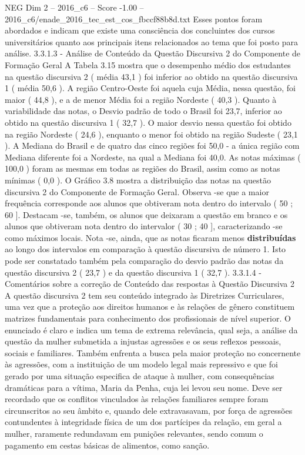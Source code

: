 \begin{textsample}{NEG Dim 2 – 2016\_c6 – Score -1.00 – 2016\_c6/enade\_2016\_tec\_est\_cos\_fbccf88b8d.txt}
Esses pontos foram abordados e indicam que existe uma consciência dos concluintes dos cursos universitários quanto aos principais itens relacionados ao tema que foi posto para análise. 3.3.1.3 - Análise de Conteúdo da Questão Discursiva 2 do Componente de Formação Geral A Tabela 3.15 mostra que o desempenho médio dos estudantes na questão discursiva 2 ( média 43,1 ) foi inferior ao obtido na questão discursiva 1 ( média 50,6 ).
A região Centro-Oeste foi aquela cuja Média, nessa questão, foi maior ( 44,8 ), e a de menor Média foi a região Nordeste ( 40,3 ).
Quanto à variabilidade das notas, o Desvio padrão de todo o Brasil foi 23,7, inferior ao obtido na questão discursiva 1 ( 32,7 ).
O maior desvio nessa questão foi obtido na região Nordeste ( 24,6 ), enquanto o menor foi obtido na região Sudeste ( 23,1 ).
A Mediana do Brasil e de quatro das cinco regiões foi 50,0 - a única região com Mediana diferente foi a Nordeste, na qual a Mediana foi 40,0.
As notas máximas ( 100,0 ) foram as mesmas em todas as regiões do Brasil, assim como as notas mínimas ( 0,0 ).
O Gráfico 3.8 mostra a distribuição das notas na questão discursiva 2 do Componente de Formação Geral.
Observa -se que a maior frequência corresponde aos alunos que obtiveram nota dentro do intervalo ( 50 ; 60 ].
Destacam -se, também, os alunos que deixaram a questão em branco e os alunos que obtiveram nota dentro do intervalor ( 30 ; 40 ], caracterizando -se como máximos locais.
Nota -se, ainda, que as notas ficaram menos \textbf{distribuídas} ao longo dos intervalos em comparação à questão discursiva de número 1.
Isto pode ser constatado também pela comparação do desvio padrão das notas da questão discursiva 2 ( 23,7 ) e da questão discursiva 1 ( 32,7 ). 3.3.1.4 - Comentários sobre a correção de Conteúdo das respostas à Questão Discursiva 2 A questão discursiva 2 tem seu conteúdo integrado às Diretrizes Curriculares, uma vez que a proteção aos direitos humanos e às relações de gênero constituem matrizes fundamentais para conhecimento dos profissionais de nível superior.
O enunciado é claro e indica um tema de extrema relevância, qual seja, a análise da questão da mulher submetida a injustas agressões e os seus reflexos pessoais, sociais e familiares.
Também enfrenta a busca pela maior proteção no concernente às agressões, com a instituição de um modelo legal mais repressivo e que foi gerado por uma situação especifica de ataque à mulher, com consequências dramáticas para a vítima, Maria da Penha, cuja lei levou seu nome.
Deve ser recordado que os conflitos vinculados às relações familiares sempre foram circunscritos ao seu âmbito e, quando dele extravasavam, por força de agressões contundentes à integridade física de um dos partícipes da relação, em geral a mulher, raramente redundavam em punições relevantes, sendo comum o pagamento em cestas básicas de alimentos, como sanção.

\end{textsample}
